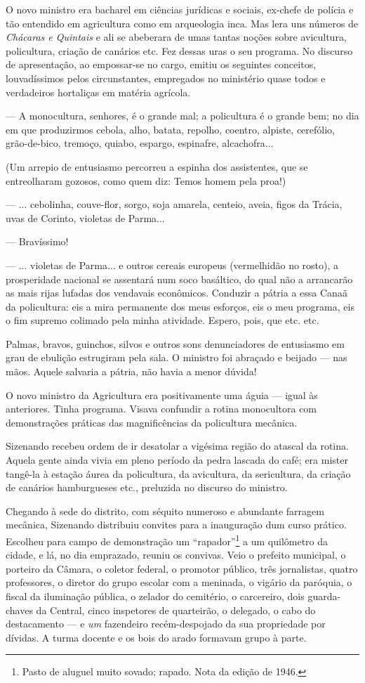 O novo ministro era bacharel em ciências jurídicas e sociais, ex-chefe
de polícia e tão entendido em agricultura como em arqueologia inca. Mas
lera uns números de \emph{Chácaras e Quintais} e ali se abeberara de
umas tantas noções sobre avicultura, policultura, criação de canários
etc. Fez dessas uras o seu programa. No discurso de apresentação, ao
empossar-se no cargo, emitiu os seguintes conceitos, louvadíssimos pelos
circunstantes, empregados no ministério quase todos e verdadeiros
hortaliças em matéria agrícola.

--- A monocultura, senhores, é o grande mal; a policultura é o grande
bem; no dia em que produzirmos cebola, alho, batata, repolho, coentro,
alpiste, cerefólio, grão-de-bico, tremoço, quiabo, espargo, espinafre,
alcachofra...

(Um arrepio de entusiasmo percorreu a espinha dos assistentes, que se
entreolharam gozosos, como quem diz: Temos homem pela proa!)

--- ... cebolinha, couve-flor, sorgo, soja amarela, centeio, aveia,
figos da Trácia, uvas de Corinto, violetas de Parma...

--- Bravíssimo!

--- ... violetas de Parma... e outros cereais europeus (vermelhidão no
rosto), a prosperidade nacional se assentará num soco basáltico, do qual
não a arrancarão as mais rijas lufadas dos vendavais econômicos.
Conduzir a pátria a essa Canaã da policultura: eis a mira permanente dos
meus esforços, eis o meu programa, eis o fim supremo colimado pela minha
atividade. Espero, pois, que etc. etc.

Palmas, bravos, guinchos, silvos e outros sons denunciadores de
entusiasmo em grau de ebulição estrugiram pela sala. O ministro foi
abraçado e beijado --- nas mãos. Aquele salvaria a pátria, não havia a
menor dúvida!

O novo ministro da Agricultura era positivamente uma águia --- igual às
anteriores. Tinha programa. Visava confundir a rotina monocultora com
demonstrações práticas das magnificências da policultura mecânica.

Sizenando recebeu ordem de ir desatolar a vigésima região do atascal da
rotina. Aquela gente ainda vivia em pleno período da pedra lascada do
café; era mister tangê-la à estação áurea da policultura, da avicultura,
da sericultura, da criação de canários hamburgueses etc., preluzida no
discurso do ministro.

Chegando à sede do distrito, com séquito numeroso e abundante farragem
mecânica, Sizenando distribuiu convites para a inauguração dum curso
prático. Escolheu para campo de demonstração um ``rapador''\footnote{Pasto
  de aluguel muito sovado; rapado. Nota da edição de 1946.} a um
quilômetro da cidade, e lá, no dia emprazado, reuniu os convivas. Veio o
prefeito municipal, o porteiro da Câmara, o coletor federal, o promotor
público, três jornalistas, quatro professores, o diretor do grupo
escolar com a meninada, o vigário da paróquia, o fiscal da iluminação
pública, o zelador do cemitério, o carcereiro, dois guarda-chaves da
Central, cinco inspetores de quarteirão, o delegado, o cabo do
destacamento --- e \emph{um} fazendeiro recém-despojado da sua
propriedade por dívidas. A turma docente e os bois do arado formavam
grupo à parte.

